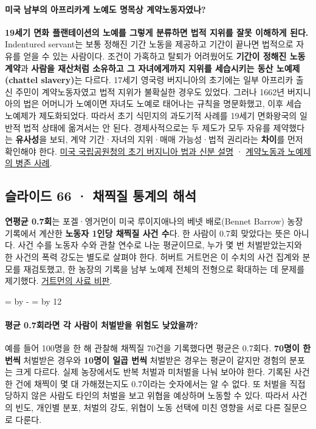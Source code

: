 \documentclass[10pt,a4paper]{article}
\newcommand{\ReserveQuestionSpace}{%
  \par\begingroup
  \dimen0=\pagegoal \advance\dimen0 by -\pagetotal
  \dimen2=\baselineskip \multiply\dimen2 by 12
  \ifdim\dimen0<\dimen2 \newpage\fi
  \endgroup}
\begin{document}
\paragraph{미국 남부의 아프리카계 노예도 명목상 계약노동자였나?}
\textbf{19세기 면화 플랜테이션의 노예를 그렇게 분류하면 법적 지위를 잘못 이해하게 된다.} Indentured servant는 보통 정해진 기간 노동을 제공하고 기간이 끝나면 법적으로 자유를 얻을 수 있는 사람이다. 조건이 가혹하고 탈퇴가 어려웠어도 \textbf{기간이 정해진 노동계약}과 \textbf{사람을 재산처럼 소유하고 그 자녀에게까지 지위를 세습시키는 동산 노예제(chattel slavery)}는 다르다. 17세기 영국령 버지니아의 초기에는 일부 아프리카 출신 주민이 계약노동자였고 법적 지위가 불확실한 경우도 있었다. 그러나 1662년 버지니아의 법은 어머니가 노예이면 자녀도 노예로 태어나는 규칙을 명문화했고, 이후 세습 노예제가 제도화되었다. 따라서 초기 식민지의 과도기적 사례를 19세기 면화왕국의 일반적 법적 상태에 옮겨서는 안 된다. 경제사적으로는 두 제도가 모두 자유를 제약했다는 \textbf{유사성}을 보되, 계약 기간·자녀의 지위·매매 가능성·법적 권리라는 \textbf{차이}를 먼저 확인해야 한다. \href{https://www.nps.gov/jame/learn/historyculture/african-americans-at-jamestown.htm}{미국 국립공원청의 초기 버지니아 법과 신분 설명} · \href{https://home.nps.gov/hamp/learn/historyculture/indentured-servants.htm}{계약노동과 노예제의 병존 사례}.\par

\subsection{슬라이드 66 · 채찍질 통계의 해석}
\textbf{연평균 0.7회}는 포겔·엥거먼이 미국 루이지애나의 베넷 배로(Bennet Barrow) 농장 기록에서 계산한 \textbf{노동자 1인당 채찍질 사건 수}다. 한 사람이 0.7회 맞았다는 뜻은 아니다. 사건 수를 노동자 수와 관찰 연수로 나눈 평균이므로, 누가 몇 번 처벌받았는지와 한 사건의 폭력 강도는 별도로 살펴야 한다. 허버트 거트먼은 이 수치의 사건 집계와 분모를 재검토했고, 한 농장의 기록을 남부 노예제 전체의 전형으로 확대하는 데 문제를 제기했다. \href{https://books.google.com/books?id=Z9PtAAAAMAAJ}{거트먼의 사료 비판}.\par

\ReserveQuestionSpace
\paragraph{평균 0.7회라면 각 사람이 처벌받을 위험도 낮았을까?}
예를 들어 100명을 한 해 관찰해 채찍질 70건을 기록했다면 평균은 0.7회다. \textbf{70명이 한 번씩} 처벌받은 경우와 \textbf{10명이 일곱 번씩} 처벌받은 경우는 평균이 같지만 경험의 분포는 크게 다르다. 실제 농장에서도 반복 처벌과 미처벌을 나눠 보아야 한다. 기록된 사건 한 건에 채찍이 몇 대 가해졌는지도 0.7이라는 숫자에서는 알 수 없다. 또 처벌을 직접 당하지 않은 사람도 타인의 처벌을 보고 위협을 예상하며 노동할 수 있다. 따라서 사건의 빈도, 개인별 분포, 처벌의 강도, 위협이 노동 선택에 미친 영향을 서로 다른 질문으로 다룬다.\par
\end{document}
